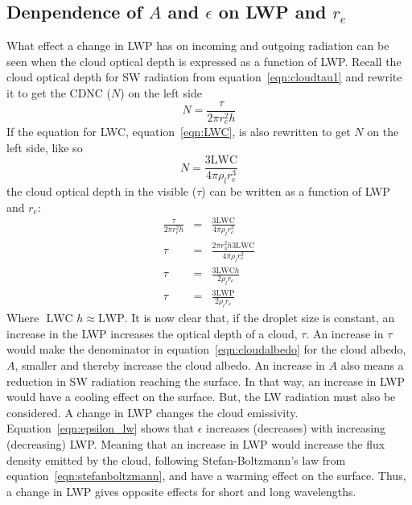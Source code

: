 \subsection{Denpendence of $A$ and $\epsilon$ on LWP and $r_e$}
What effect a change in LWP has on incoming and outgoing radiation can be seen when the cloud optical depth is expressed as a function of LWP. Recall the cloud optical depth for SW radiation from equation~\ref{eqn:cloudtau1} and rewrite it to get the CDNC ($N$) on the left side
\begin{equation}
N = \frac{\tau}{2\pi r^2_e h}
\end{equation}
If the equation for LWC, equation~\ref{eqn:LWC}, is also rewritten to get $N$ on the left side, like so
\begin{equation}
N = \frac{3\text{LWC}}{4\pi \rho_l r^3_e}
\end{equation}
the cloud optical depth in the visible ($\tau$) can be written as a function of LWP and $r_e$:
\begin{eqnarray}
\frac{\tau}{2\pi r^2_e h} &=& \frac{3\text{LWC}}{4\pi \rho_l r^3_e}\\
\tau &=& \frac{2\pi r^2_3 h 3\text{LWC}}{4\pi \rho_l r^3_e}\\
\tau &=& \frac{3\text{LWC} h}{2\rho_l r_e}\\
\tau &=& \frac{3\text{LWP}}{2\rho_l r_e}
\label{eqn:cloudtau}
\end{eqnarray}
Where $\text{ LWC }h \approx \text{LWP}$. It is now clear that, if the droplet size is constant, an increase in the LWP increases the optical depth of a cloud, $\tau$. An increase in $\tau$ would make the denominator in equation~\ref{eqn:cloudalbedo} for the cloud albedo, $A$, smaller and thereby increase the cloud albedo. An increase in $A$ also means a reduction in SW radiation reaching the surface. In that way, an increase in LWP would have a cooling effect on the surface.
But, the LW radiation must also be considered. A change in LWP changes the cloud emissivity. Equation~\ref{eqn:epsilon_lw} shows that $\epsilon$ increases (decreases) with increasing (decreasing) LWP. Meaning that an increase in LWP would increase the flux density emitted by the cloud, following Stefan-Boltzmann's law from equation~\ref{eqn:stefanboltzmann}, and have a warming effect on the surface. Thus, a change in LWP gives opposite effects for short and long wavelengths.

